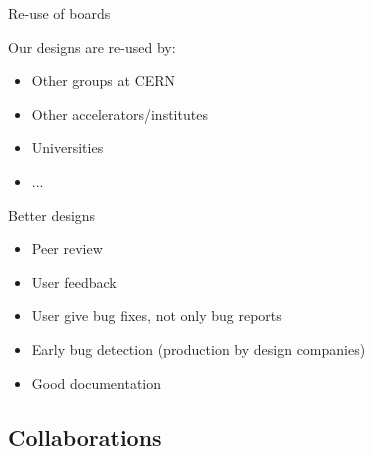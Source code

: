 \documentclass[compress,red]{beamer}
\begin{document}
\begin{frame}{Re-use of boards}

  \begin{block}{Our designs are re-used by:}
    \begin{itemize}
    \item Other groups at CERN
    \item Other accelerators/institutes
    \item Universities
    \item ...
    \end{itemize}
  \end{block}

\end{frame}

\begin{frame}{Better designs}

  \begin{block}{}
    \begin{itemize}
    \item Peer review
    \item User feedback
    \item User give bug fixes, not only bug reports
    \item Early bug detection (production by design companies)
    \item Good documentation
    \end{itemize}
  \end{block}

\end{frame}

\subsection{Collaborations}
\end{document}
